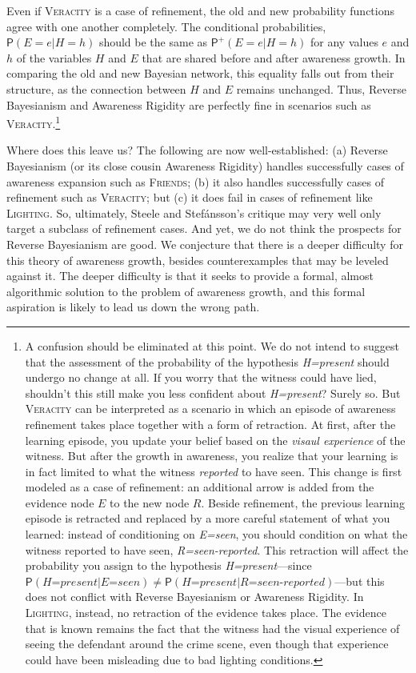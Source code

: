 \documentclass[
  11pt,
  dvipsnames,enabledeprecatedfontcommands]{scrartcl}
\newcommand{\pr}[1]{\ensuremath{\mathsf{P}(#1)}}
\newcommand{\ppr}[2]{\ensuremath{\mathsf{P}^{#1}(#2)}}
\begin{document}
Even if \textsc{Veracity} is a case of refinement, the old and new
probability functions agree with one another completely. The conditional
probabilities, \(\pr{E=e \vert H=h}\) should be the same as
\(\ppr{+}{E=e \vert H=h}\) for any values \(e\) and \(h\) of the
variables \(H\) and \(E\) that are shared before and after awareness
growth. In comparing the old and new Bayesian network, this equality
falls out from their structure, as the connection between \(H\) and
\(E\) remains unchanged. Thus, Reverse Bayesianism and Awareness
Rigidity are perfectly fine in scenarios such as
\textsc{Veracity}.\footnote{A confusion should be eliminated at this
  point. We do not intend to suggest that the assessment of the
  probability of the hypothesis \textit{H=present} should undergo no
  change at all. If you worry that the witness could have lied,
  shouldn't this still make you less confident about \textit{H=present}?
  Surely so. But \textsc{Veracity} can be interpreted as a scenario in
  which an episode of awareness refinement takes place together with a
  form of retraction. At first, after the learning episode, you update
  your belief based on the \textit{visaul experience} of the witness.
  But after the growth in awareness, you realize that your learning is
  in fact limited to what the witness \textit{reported} to have seen.
  This change is first modeled as a case of refinement: an additional
  arrow is added from the evidence node \(E\) to the new node \(R\).
  Beside refinement, the previous learning episode is retracted and
  replaced by a more careful statement of what you learned: instead of
  conditioning on \textit{E=seen}, you should condition on what the
  witness reported to have seen, \textit{R=seen-reported}. This
  retraction will affect the probability you assign to the hypothesis
  \textit{H=present}---since
  \(\pr{\textit{H=present}\vert \textit{E=seen}}\neq \pr{\textit{H=present}\vert \textit{R=seen-reported}}\)---but
  this does not conflict with Reverse Bayesianism or Awareness Rigidity.
  In \textsc{Lighting}, instead, no retraction of the evidence takes
  place. The evidence that is known remains the fact that the witness
  had the visual experience of seeing the defendant around the crime
  scene, even though that experience could have been misleading due to
  bad lighting conditions.}

Where does this leave us? The following are now well-established: (a)
Reverse Bayesianism (or its close cousin Awareness Rigidity) handles
successfully cases of awareness expansion such as \textsc{Friends}; (b)
it also handles successfully cases of refinement such as
\textsc{Veracity}; but (c) it does fail in cases of refinement like
\textsc{Lighting}. So, ultimately, Steele and Stefánsson's critique may
very well only target a subclass of refinement cases. And yet, we do not
think the prospects for Reverse Bayesianism are good. We conjecture that
there is a deeper difficulty for this theory of awareness growth,
besides counterexamples that may be leveled against it. The deeper
difficulty is that it seeks to provide a formal, almost algorithmic
solution to the problem of awareness growth, and this formal aspiration
is likely to lead us down the wrong path.
\end{document}
